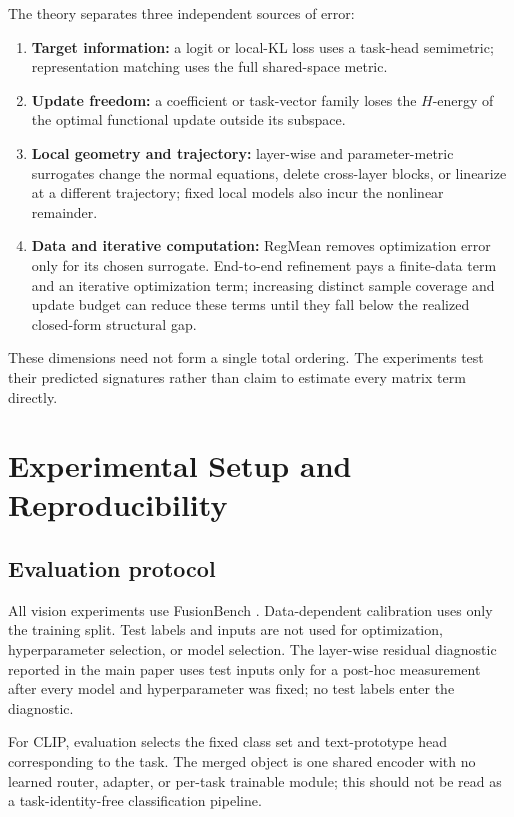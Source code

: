 \documentclass[letterpaper]{article} %
\theoremstyle{plain}
\theoremstyle{definition}
\begin{document}
The theory separates three independent sources of error:
\begin{enumerate}
    \item \textbf{Target information:} a logit or local-KL loss uses a task-head
semimetric; representation matching uses the full shared-space metric.
    \item \textbf{Update freedom:} a coefficient or task-vector family loses the
$H$-energy of the optimal functional update outside its subspace.
    \item \textbf{Local geometry and trajectory:} layer-wise and parameter-metric
surrogates change the normal equations, delete cross-layer blocks, or linearize at a different trajectory; fixed local models also incur the nonlinear remainder.
    \item \textbf{Data and iterative computation:} RegMean removes optimization error only
for its chosen surrogate.
End-to-end refinement pays a finite-data term and an iterative optimization term; increasing distinct sample coverage and update budget can reduce these terms until they fall below the realized closed-form structural gap.
\end{enumerate}
These dimensions need not form a single total ordering.
The experiments test their predicted signatures rather than claim to estimate every matrix term directly.
\section{Experimental Setup and Reproducibility}
\label{app:setup}

\subsection{Evaluation protocol}
All vision experiments use FusionBench \citep{tang2024fusionbench}.
Data-dependent calibration uses only the training split.
Test labels and inputs are not used for optimization, hyperparameter selection, or model selection.
The layer-wise residual diagnostic reported in the main paper uses test inputs only for a post-hoc measurement after every model and hyperparameter was fixed; no test labels enter the diagnostic.

For CLIP, evaluation selects the fixed class set and text-prototype head corresponding to the task.
The merged object is one shared encoder with no learned router, adapter, or per-task trainable module; this should not be read as a task-identity-free classification pipeline.
\end{document}
